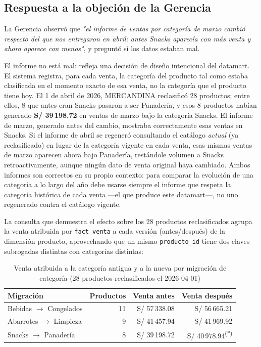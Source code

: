 \documentclass[11pt,a4paper]{article}
\begin{document}
\subsection{Respuesta a la objeción de la Gerencia}

La Gerencia observó que \emph{"el informe de ventas por categoría de marzo cambió respecto del que nos entregaron en abril: antes Snacks aparecía con más venta y ahora aparece con menos"}, y preguntó si los datos estaban mal.

El informe no está mal: refleja una decisión de diseño intencional del datamart. El sistema registra, para cada venta, la categoría del producto tal como estaba clasificada en el momento exacto de esa venta, no la categoría que el producto tiene hoy. El 1 de abril de 2026, MERCANDINA reclasificó 28 productos; entre ellos, 8 que antes eran Snacks pasaron a ser Panadería, y esos 8 productos habían generado \textbf{S/ 39\,198.72} en ventas de marzo bajo la categoría Snacks. El informe de marzo, generado antes del cambio, mostraba correctamente esas ventas en Snacks. Si el informe de abril se regeneró consultando el catálogo \emph{actual} (ya reclasificado) en lugar de la categoría vigente en cada venta, esas mismas ventas de marzo aparecen ahora bajo Panadería, restándole volumen a Snacks retroactivamente, aunque ningún dato de venta original haya cambiado. Ambos informes son correctos en su propio contexto: para comparar la evolución de una categoría a lo largo del año debe usarse siempre el informe que respeta la categoría histórica de cada venta —el que produce este datamart—, no uno regenerado contra el catálogo vigente.

La consulta que demuestra el efecto sobre los 28 productos reclasificados agrupa la venta atribuida por \texttt{fact\_venta} a cada versión (antes/después) de la dimensión producto, aprovechando que un mismo \texttt{producto\_id} tiene dos claves subrogadas distintas con categorías distintas:

\begin{table}[h!]
\centering
\caption{Venta atribuida a la categoría antigua y a la nueva por migración de categoría (28 productos reclasificados el 2026-04-01)}
\label{tab:migracion}
\begin{tabular}{lrrr}
\toprule
\textbf{Migración} & \textbf{Productos} & \textbf{Venta antes} & \textbf{Venta después} \\
\midrule
Bebidas $\rightarrow$ Congelados  & 11 & S/ 57\,338.08 & S/ 56\,665.21 \\
Abarrotes $\rightarrow$ Limpieza  & 9  & S/ 41\,457.94 & S/ 41\,969.92 \\
Snacks $\rightarrow$ Panadería    & 8  & S/ 39\,198.72 & S/ 40\,978.94\textsuperscript{(*)} \\
\bottomrule
\end{tabular}
\end{table}
\end{document}
